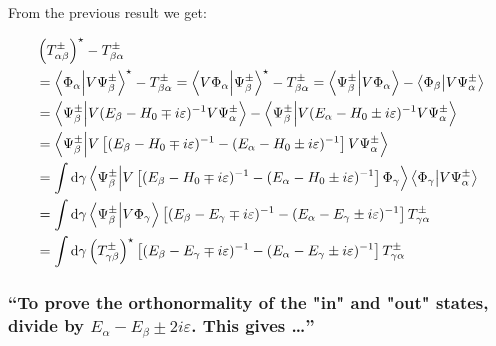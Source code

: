 \subsubsection{ }\label{sususec:3_2_p116_3}
From the previous result we get:
\begin{widetext}
	\begin{align*}
		&\left(T_{\alpha\beta}^\pm\right)^\star-T_{\beta\alpha}^\pm\\
		&=\braket{\Phi_\alpha}{V\Psi_\beta^\pm}^\star-T_{\beta\alpha}^\pm
		=\braket{V\Phi_\alpha}{\Psi_\beta^\pm}^\star-T_{\beta\alpha}^\pm
		=\braket{\Psi_\beta^\pm}{V\Phi_\alpha}-\braket{\Phi_\beta}{V\Psi_\alpha^\pm}\\
		&=\braket{\Psi_\beta^\pm}{V(E_\beta-H_0\mp i \varepsilon)^{-1}V\Psi_\alpha^\pm}
		-\braket{\Psi_\beta^\pm}{V(E_\alpha-H_0\pm i \varepsilon)^{-1}V\Psi_\alpha^\pm}\\
		&=\braket{\Psi_\beta^\pm}{V\left[(E_\beta-H_0\mp i \varepsilon)^{-1}-(E_\alpha-H_0\pm i \varepsilon)^{-1}\right]V\Psi_\alpha^\pm}\\
		&=\int\dd{\gamma}\braket{\Psi_\beta^\pm}{V\left[(E_\beta-H_0\mp i \varepsilon)^{-1}-(E_\alpha-H_0\pm i \varepsilon)^{-1}\right]\Phi_\gamma}
		\braket{\Phi_\gamma}{V\Psi_\alpha^\pm}\\
		&=\int\dd{\gamma}\braket{\Psi_\beta^\pm}{V\Phi_\gamma}\left[(E_\beta-E_\gamma\mp i \varepsilon)^{-1}-(E_\alpha-E_\gamma\pm i \varepsilon)^{-1}\right]
		T_{\gamma\alpha}^\pm\\
		&=\int\dd{\gamma}\left(T_{\gamma\beta}^\pm\right)^\star\left[(E_\beta-E_\gamma\mp i \varepsilon)^{-1}-(E_\alpha-E_\gamma\pm i \varepsilon)^{-1}\right]
		T_{\gamma\alpha}^\pm
	\end{align*}


	\subsubsection{\enquote{To prove the orthonormality of the "in" and "out" states, divide  by $E_\alpha-E_\beta\pm 2i\varepsilon$. This gives \dots} }
	
	\label{sususec:3_2_p116_1}
	

\end{widetext}
